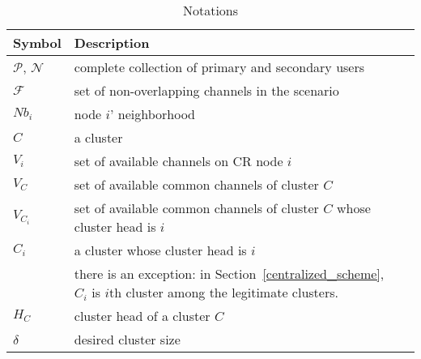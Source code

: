 
\begin{table}[ht!]
\caption{Notations}\label{tab1}
\centering
\begin{tabular}{llr}
\toprule
Symbol & Description \\
\midrule
$\mathcal{P}$, $\mathcal{N}$  & complete collection of primary and secondary users\\
$\mathcal{F}$ & set of non-overlapping channels in the scenario\\
$Nb_i$ & node $i$' neighborhood     \\
$C$ & a cluster \\
$V_i$   & set of available channels on CR node $i$  \\
$V_C$   & set of available common channels of cluster $C$  \\
$V_{C_i}$   & set of available common channels of cluster $C$ whose cluster head is $i$\\
$C_i$ & a cluster whose cluster head is $i$ \\
& there is an exception: in Section~\ref{centralized_scheme}, $C_i$ is $i$th cluster among the legitimate clusters.\\
$H_C$ & cluster head of a cluster $C$\\
$\delta$ & desired cluster size\\

\end{tabular}
\end{table}
